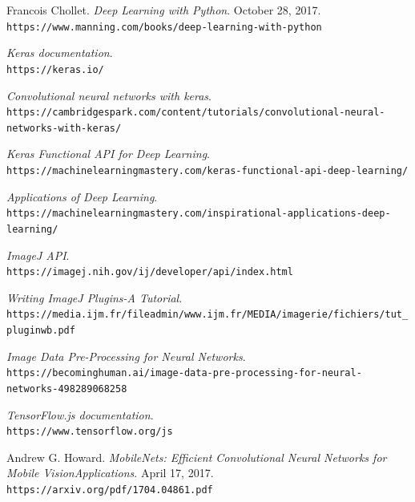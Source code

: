 \documentclass{VUMIFInfKursinis}
\begin{document}
\begin{thebibliography}{9}

Francois Chollet. 
\textit{Deep Learning with Python}. 
October 28, 2017.
\\\texttt{https://www.manning.com/books/deep-learning-with-python}

\textit{Keras documentation}.
\\\texttt{https://keras.io/}

\footnotesize
{} 
\textit{Convolutional neural networks with keras}.
\\\texttt{https://cambridgespark.com/content/tutorials/convolutional-neural-networks-with-keras/}

\textit{Keras Functional API for Deep Learning}.
\\\texttt{https://machinelearningmastery.com/keras-functional-api-deep-learning/}

\textit{Applications of Deep Learning}.
\\\texttt{https://machinelearningmastery.com/inspirational-applications-deep-learning/}

\textit{ImageJ API}.
\\\texttt{https://imagej.nih.gov/ij/developer/api/index.html}

\textit{Writing ImageJ Plugins-A Tutorial}.
\\\texttt{https://media.ijm.fr/fileadmin/www.ijm.fr/MEDIA/imagerie/fichiers/tut\_pluginwb.pdf}

\textit{Image Data Pre-Processing for Neural Networks}.
\\\texttt{https://becominghuman.ai/image-data-pre-processing-for-neural-networks-498289068258}

\textit{TensorFlow.js documentation}.
\\\texttt{https://www.tensorflow.org/js}

Andrew G. Howard.
\textit{MobileNets: Efficient Convolutional Neural Networks for Mobile VisionApplications}.
April 17, 2017.
\\\texttt{https://arxiv.org/pdf/1704.04861.pdf}


\end{thebibliography}
\end{document}
